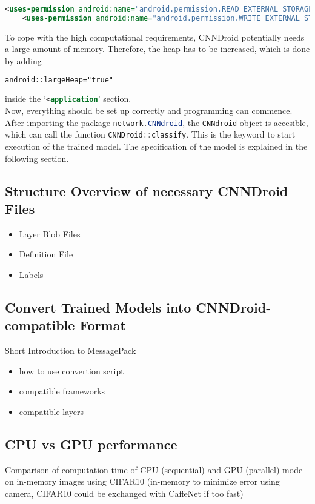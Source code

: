 \begin{lstlisting}[language=XML, basicstyle=\scriptsize]
    <uses-permission android:name="android.permission.READ_EXTERNAL_STORAGE"/>
    <uses-permission android:name="android.permission.WRITE_EXTERNAL_STORAGE"/>
\end{lstlisting}

To cope with the high computational requirements, CNNDroid potentially needs a large amount of memory. Therefore, the heap has to be increased, which is done by adding

\begin{lstlisting}[language=XML, basicstyle=\scriptsize]
    android::largeHeap="true"
\end{lstlisting}
\noindent
inside the `\lstinline[language=XML]{<application}' section.\\
Now, everything should be set up correctly and programming can commence.\\
After importing the package \lstinline[language=Java]{network.CNNdroid}, the \lstinline[language=Java]{CNNdroid} object is accesible, which can call the function \lstinline[language=Java]{CNNDroid::classify}. This is the keyword to start execution of the trained model. The specification of the model is explained in the following section.

\subsection{Structure Overview of necessary CNNDroid Files}
\begin{itemize}
    \item{Layer Blob Files}
    \item{Definition File}
    \item{Labels}
\end{itemize}

\subsection{Convert Trained Models into CNNDroid-compatible Format}
Short Introduction to MessagePack
\begin{itemize}
    \item{how to use convertion script}
    \item{compatible frameworks}
    \item{compatible layers}
\end{itemize}

\subsection{CPU vs GPU performance}
Comparison of computation time of CPU (sequential) and GPU (parallel) mode on in-memory images using CIFAR10 (in-memory to minimize error using camera, CIFAR10 could be exchanged with CaffeNet if too fast)